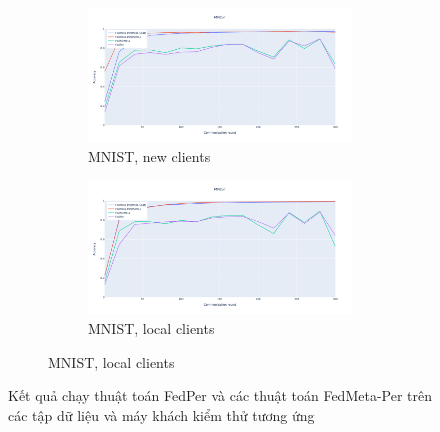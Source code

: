 \begin{figure}
    \begin{subfigure}{\textwidth}
        \centering
        \begin{subfigure}{.5\textwidth}
            \centering
            \includegraphics[width=\linewidth]{./images/mnist_per_new.png}
            \caption{MNIST, new clients}
            \label{fig:mnist_per_new}
        \end{subfigure}%
        \begin{subfigure}{.5\textwidth}
            \centering
            \includegraphics[width=\linewidth]{./images/mnist_per_old.png}
            \caption{MNIST, local clients}
            \label{fig:mnist_per_old}
        \end{subfigure}
    \end{subfigure}
    \caption{Kết quả chạy thuật toán FedPer và các thuật toán FedMeta-Per trên các tập dữ liệu và máy khách kiểm thử tương ứng}
    \label{fig:fedmetaper_acc}
\end{figure}
